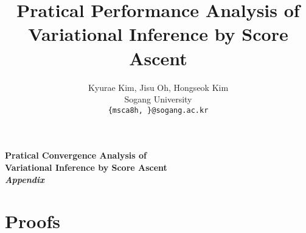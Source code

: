 \documentclass{article}
\title{Pratical Performance Analysis of \\ Variational Inference by Score Ascent}
\author{%
  Kyurae Kim, Jisu Oh, Hongseok Kim \\
  Sogang University \\
  \texttt{\{msca8h, \}@sogang.ac.kr} \\
}
\begin{document}
\maketitle

\begin{abstract}
  
\end{abstract}









\newpage



\newpage
\appendix

\begin{center}
  \LARGE\bf
  Pratical Convergence Analysis of \\
  Variational Inference by Score Ascent \\
  \textit{Appendix}
\end{center}



%


\section{Proofs}\label{section:proofs}
%
%
\printProofs
\end{document}
